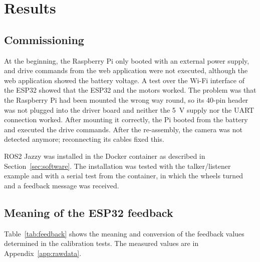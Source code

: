 \chapter{Results}
\label{ch:results}

\section{Commissioning}
\label{sec:commissioning}

At the beginning, the Raspberry Pi only booted with an external power supply, and drive commands from the web application were not executed, although the web application showed the battery voltage. A test over the Wi-Fi interface of the ESP32 showed that the ESP32 and the motors worked. The problem was that the Raspberry Pi had been mounted the wrong way round, so its 40-pin header was not plugged into the driver board and neither the \SI{5}{\volt} supply nor the UART connection worked. After mounting it correctly, the Pi booted from the battery and executed the drive commands. After the re-assembly, the camera was not detected anymore; reconnecting its cables fixed this.

ROS2 Jazzy was installed in the Docker container as described in Section~\ref{sec:software}. The installation was tested with the talker/listener example and with a serial test from the container, in which the wheels turned and a feedback message was received.

\section{Meaning of the ESP32 feedback}
\label{sec:feedback_results}

Table~\ref{tab:feedback} shows the meaning and conversion of the feedback values determined in the calibration tests. The measured values are in Appendix~\ref{app:rawdata}.

